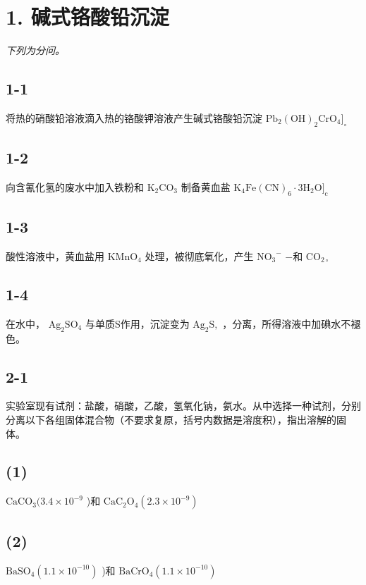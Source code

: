 \section*{1. 碱式铬酸铅沉淀}
\textit{下列为分问。}

\subsection*{1-1}
将热的硝酸铅溶液滴⼊热的铬酸钾溶液产⽣碱式铬酸铅沉淀 $\mathrm { P b _ { 2 } ( O H ) _ { 2 } C r O _ { 4 } ] _ { \circ } }$

\subsection*{1-2}
向含氰化氢的废⽔中加⼊铁粉和 $\mathrm { K _ { 2 } C O _ { 3 } }$ 制备⻩⾎盐 $\mathrm { { K _ { 4 } F e ( C N ) _ { 6 } { \cdot } 3 H _ { 2 } O ] _ { c } } }$

\subsection*{1-3}
酸性溶液中，⻩⾎盐⽤ $\mathrm { K M n O _ { 4 } }$ 处理，被彻底氧化，产⽣ $\mathrm { N O _ { 3 } } ^ { - }$ −和 $\mathrm { { C O } _ { 2 \circ } }$

\subsection*{1-4}
在⽔中， $\mathrm { A g _ { 2 } S O _ { 4 } }$ 与单质S作⽤，沉淀变为 $\mathrm { A g } _ { 2 } \mathrm { S } ,$ ，分离，所得溶液中加碘⽔不褪⾊。

\subsection*{2-1}
实验室现有试剂：盐酸，硝酸，⼄酸，氢氧化钠，氨⽔。从中选择⼀种试剂，分别分离以下各组固体混合物（不要求复原，括号内数据是溶度积），指出溶解的固体。

\subsection*{(1)}
$\mathrm { C a C O _ { 3 } } ( 3 . 4 \times 1 0 ^ { - 9 }$ )和 $\mathrm { C a C _ { 2 } O _ { 4 } } \left( 2 . 3 { \times } 1 0 ^ { - 9 } \right)$

\subsection*{(2)}
$\mathrm { B a S O _ { 4 } } \left( 1 . 1 \times 1 0 ^ { - 1 0 } \right)$ )和 $\mathrm { B a C r O _ { 4 } } \left( 1 . 1 { \times } 1 0 ^ { - 1 0 } \right)$

